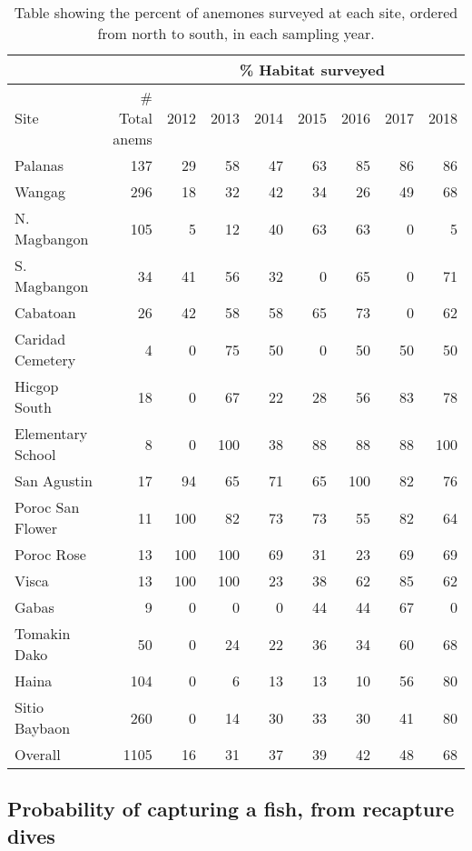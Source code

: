 \documentclass[12pt, oneside]{article}   	%
\begin{document}
\begin{table}[!htbp]
\caption{Table showing the percent of anemones surveyed at each site, ordered from north to south, in each sampling year.}\label{APP_TAB_PercHabSampled}
\begin{centering}
\begin{tabular}{|l|r|r|r|r|r|r|r|r|}
\hline 
\multicolumn{2}{|c|}{} & \multicolumn{7}{|c|}{\% Habitat surveyed} \\ \hline
Site & \# Total anems & 2012 & 2013 & 2014 & 2015 & 2016 & 2017 & 2018 \\ \hline
Palanas & 137 & 29 & 58 & 47 & 63 & 85 & 86 & 86 \\ \hline
Wangag & 296 & 18 & 32 & 42 & 34 & 26 & 49 & 68 \\ \hline
N. Magbangon & 105 & 5 & 12 & 40 & 63 & 63 & 0 & 5 \\ \hline
S. Magbangon & 34 & 41 & 56 & 32 & 0 & 65 & 0 & 71 \\ \hline
Cabatoan & 26 & 42 & 58 & 58 & 65 & 73 & 0 & 62 \\ \hline
Caridad Cemetery & 4 & 0 & 75 & 50 & 0 & 50 & 50 & 50 \\ \hline
Hicgop South & 18 & 0 & 67 & 22 & 28 & 56 & 83 & 78 \\ \hline
Elementary School & 8 & 0 & 100 & 38 & 88 & 88 & 88 & 100 \\ \hline
San Agustin & 17 & 94 & 65 & 71 & 65 & 100 & 82 & 76 \\ \hline
Poroc San Flower & 11 & 100 & 82 & 73 & 73 & 55 & 82 & 64 \\ \hline
Poroc Rose & 13 & 100 & 100 & 69 & 31 & 23 & 69 & 69 \\ \hline
Visca & 13 & 100 & 100 & 23 & 38 & 62 & 85 & 62 \\ \hline
Gabas & 9 & 0 & 0 & 0 & 44 & 44 & 67 & 0 \\ \hline
Tomakin Dako & 50 & 0 & 24 & 22 & 36 & 34 & 60 & 68 \\ \hline
Haina & 104 & 0 & 6 & 13 & 13 & 10 & 56 & 80 \\ \hline
Sitio Baybaon & 260 & 0 & 14 & 30 & 33 & 30 & 41 & 80 \\ \hline
Overall & 1105 & 16 & 31 & 37 & 39 & 42 & 48 & 68 \\ \hline
\end{tabular}
\end{centering}
\end{table}

\newpage{}

\subsection{Probability of capturing a fish, from recapture dives} \label{APP_SEC_ProbR}
\end{document}
